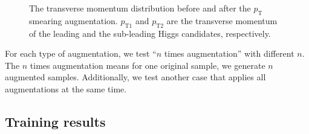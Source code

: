 \documentclass[12pt]{article}
\begin{document}
        \begin{figure}[htpb]
            \centering
            \caption{The transverse momentum distribution before and after the $p_{\text{T}}$ smearing augmentation. $p_{\text{T1}}$ and $p_{\text{T2}}$ are the transverse momentum of the leading and the sub-leading Higgs candidates, respectively.}
            \label{fig:pt_smearing_pt_distribution}
        \end{figure}

        For each type of augmentation, we test ``$n$ times augmentation'' with different $n$. The $n$ times augmentation means for one original sample, we generate $n$ augmented samples. Additionally, we test another case that applies all augmentations at the same time.
    \subsection{Training results}%
    \label{sub:training_results_physical_augmentation}
\end{document}
